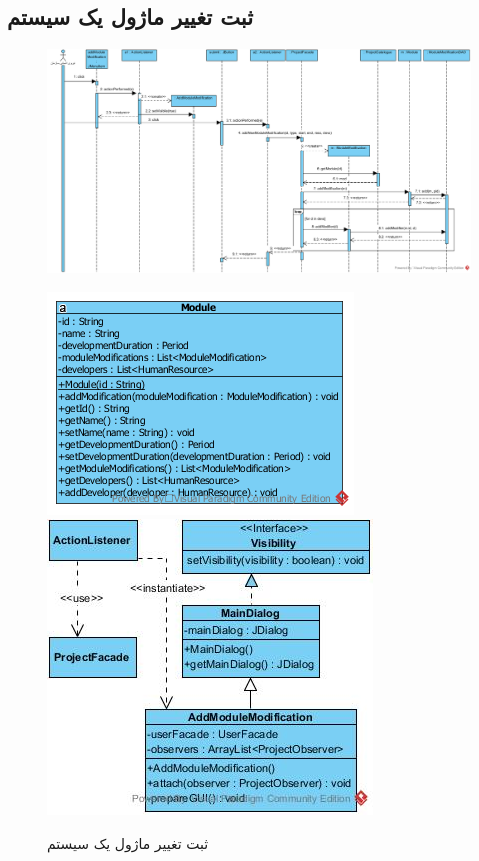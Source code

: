 \begin{landscape}
\newpage
\section{ثبت تغییر ماژول یک سیستم}
\begin{figure}[H]
	\centering
	\includegraphics[scale=0.55]{img/sequence-design/AddModuleModification}	
\end{figure}
\begin{figure}[H]
	\centering
	\includegraphics[scale=0.4]{img/sequence-design/AddModuleModificationC}
	\includegraphics[scale=0.5]{img/sequence-design/AddModuleModificationUI}
	\caption{ثبت تغییر ماژول یک سیستم}
\end{figure}


\end{landscape}
